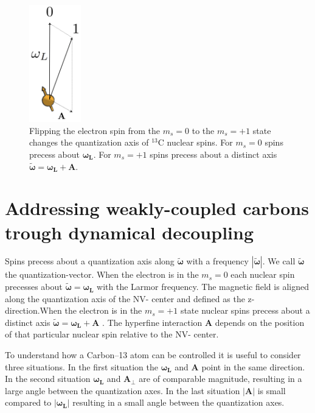 \begin{figure}[htbp]
\centering
\includegraphics[keepaspectratio,width=0.2\textwidth,height=0.75\textheight]{./img/QuantizationAxis.png}
\caption{Flipping the electron spin from the  $m_s=0$ to the $m_s= +1$ state changes the quantization axis of $^{13}\mathrm{C}$ nuclear spins. For  $m_s=0$ spins precess about $\bm{\omega_L}$. For  $m_s=+1$ spins precess about a distinct axis $\bm{\tilde{\omega}}=\bm{\omega_L} +\bm{A}$.}
\label{fig:quantax}
\end{figure}




\section{Addressing weakly-coupled carbons trough dynamical decoupling}
\label{controllingacarbonthroughdynamicaldecoupling}
Spins precess about a quantization axis along $ \bm{\tilde{\omega}}$ with a frequency $|\bm{\tilde{\omega}}|$. We call $ \bm{\tilde{\omega}} $ the quantization-vector. When the electron is in the $m_s=0$ each nuclear spin precesses about $\bm{\tilde{\omega}} = \bm{\omega_L}$ with the Larmor frequency. The magnetic field is aligned along the quantization axis of the NV- center and defined as the z-direction.When the electron is in the $m_s=+1$ state nuclear spins precess about a distinct axis $\bm{\tilde{\omega}}=\bm{\omega_L} +\bm{A}$ \citep{Taminiau2012Detection}. The hyperfine interaction $\bm{A}$ depends on the position of that particular nuclear spin relative to the NV- center.

To understand how a Carbon--13 atom can be controlled it is useful to consider three situations. In the first situation the $\bm{\omega_L}$ and $\bm{A}$ point in the same direction. In the second situation $\bm{\omega_L}$ and $\bm{A_\perp}$ are of comparable magnitude, resulting in a large angle between the quantization axes. In the last situation $|\bm{A}|$ is small compared to  $\bm{|\omega_L|}$ resulting in a small angle between the quantization axes.

